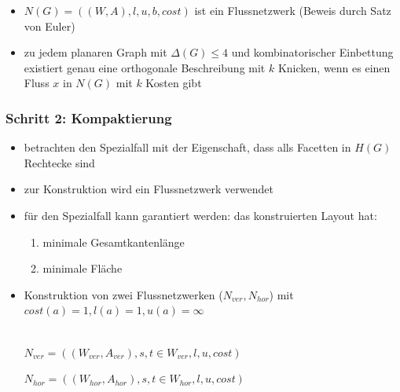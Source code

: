 \begin{itemize}[itemsep=-1pt]
	\item $N(G)=((W,A),l,u,b,cost)$ ist ein Flussnetzwerk (Beweis durch Satz von Euler)
	\item zu jedem planaren Graph mit $\Delta(G)\leq 4$ und kombinatorischer Einbettung existiert genau eine orthogonale Beschreibung mit $k$ Knicken, wenn es einen Fluss $x$ in $N(G)$ mit $k$ Kosten gibt
		\vspace*{-\baselineskip}%
\end{itemize}

\subsubsection{Schritt 2: Kompaktierung}
\begin{itemize}[itemsep=-1pt]
	\item betrachten den Spezialfall mit der Eigenschaft, dass alls Facetten in $H(G)$ Rechtecke sind
	\item zur Konstruktion wird ein Flussnetzwerk verwendet
	\item für den Spezialfall kann garantiert werden: das konstruierten Layout hat:
		\begin{enumerate}
			\item minimale Gesamtkantenlänge
			\item minimale Fläche
		\end{enumerate}
	\item Konstruktion von zwei Flussnetzwerken ($N_{ver},N_{hor}$) mit $cost(a)=1, l(a)=1, u(a)=\infty$\\\\
		\begin{minipage}{0.48\textwidth}
			\begin{center}
			$N_{ver}=((W_{ver},A_{ver}),s,t\in W_{ver},l,u,cost)$\\
			\vspace*{2cm}
			
			\vspace*{1.5cm}
			\end{center}
		\end{minipage}
		\begin{minipage}{0.48\textwidth}
			\begin{center}
			$N_{hor}=((W_{hor},A_{hor}),s,t\in W_{hor},l,u,cost)$\\
			\vfill
			
			\end{center}
		\end{minipage}\\

\end{itemize}
